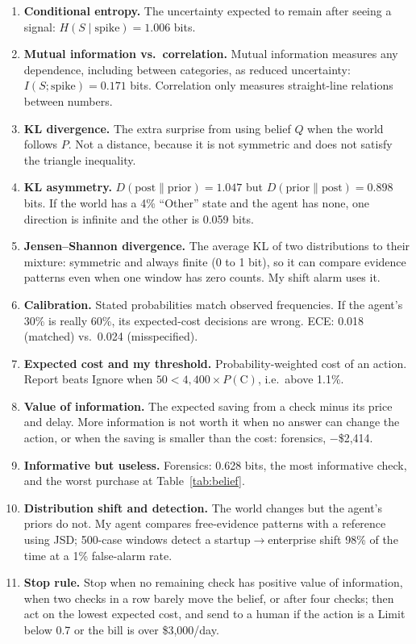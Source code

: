 \documentclass{article}
\begin{document}
\begin{enumerate}
\item \textbf{Conditional entropy.} The uncertainty expected to remain after seeing a signal: $H(S \mid \text{spike}) = 1.006$ bits.
\item \textbf{Mutual information vs.\ correlation.} Mutual information measures any dependence, including between categories, as reduced uncertainty: $I(S;\text{spike}) = 0.171$ bits. Correlation only measures straight-line relations between numbers.
\item \textbf{KL divergence.} The extra surprise from using belief $Q$ when the world follows $P$. Not a distance, because it is not symmetric and does not satisfy the triangle inequality.
\item \textbf{KL asymmetry.} $D(\text{post}\|\text{prior}) = 1.047$ but $D(\text{prior}\|\text{post}) = 0.898$ bits. If the world has a 4\% ``Other'' state and the agent has none, one direction is infinite and the other is 0.059 bits.
\item \textbf{Jensen--Shannon divergence.} The average KL of two distributions to their mixture: symmetric and always finite (0 to 1 bit), so it can compare evidence patterns even when one window has zero counts. My shift alarm uses it.
\item \textbf{Calibration.} Stated probabilities match observed frequencies. If the agent's 30\% is really 60\%, its expected-cost decisions are wrong. ECE: 0.018 (matched) vs.\ 0.024 (misspecified).
\item \textbf{Expected cost and my threshold.} Probability-weighted cost of an action. Report beats Ignore when $50 < 4{,}400 \times P(\mathrm{C})$, i.e.\ above 1.1\%.
\item \textbf{Value of information.} The expected saving from a check minus its price and delay. More information is not worth it when no answer can change the action, or when the saving is smaller than the cost: forensics, $-$\$2,414.
\item \textbf{Informative but useless.} Forensics: 0.628 bits, the most informative check, and the worst purchase at Table~\ref{tab:belief}.
\item \textbf{Distribution shift and detection.} The world changes but the agent's priors do not. My agent compares free-evidence patterns with a reference using JSD; 500-case windows detect a startup$\rightarrow$enterprise shift 98\% of the time at a 1\% false-alarm rate.
\item \textbf{Stop rule.} Stop when no remaining check has positive value of information, when two checks in a row barely move the belief, or after four checks; then act on the lowest expected cost, and send to a human if the action is a Limit below 0.7 or the bill is over \$3,000/day.
\end{enumerate}
\end{document}

